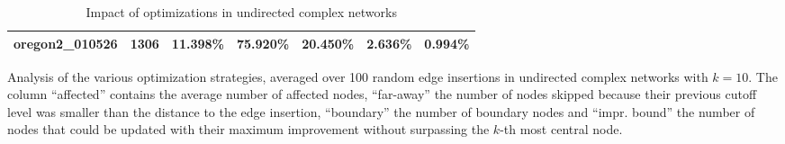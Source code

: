 \begin{table}[h!]
\begin{tabular}{lrrllll}
 oregon2\_010526       &       1306 & 11.398\% & 75.920\%    & 20.450\%    & 2.636\%        & 0.994\%   \\
\bottomrule
\end{tabular}
\caption{Impact of optimizations in undirected complex networks}{Analysis of the various optimization strategies, averaged over 100 random edge insertions in undirected complex networks with $k = 10$. The column ``affected'' contains the average number of affected nodes, ``far-away'' the number of nodes skipped because their previous cutoff level was smaller than the distance to the edge insertion, ``boundary'' the number of boundary nodes and ``impr. bound'' the number of nodes that could be updated with their maximum improvement without surpassing the $k$-th most central node.}
\label{tbl:optimizationImpact}
\end{table}

